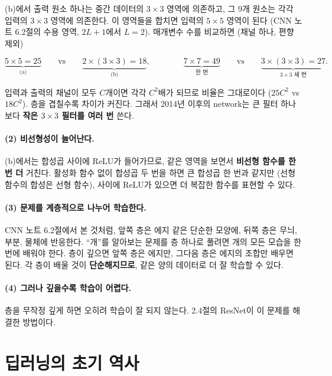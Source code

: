 \documentclass[11pt,a4paper]{article}
\begin{document}
(b)에서 출력 원소 하나는 중간 데이터의 $3\times3$ 영역에 의존하고, 그 $9$개 원소는 각각 입력의 $3\times3$ 영역에 의존한다.
이 영역들을 합치면 입력의 $5\times5$ 영역이 된다 (CNN 노트 6.2절의 수용 영역, $2L+1$에서 $L=2$).
매개변수 수를 비교하면 (채널 하나, 편향 제외)

\[
\underbrace{5\times5=25}_{\text{(a)}} \qquad\text{vs}\qquad \underbrace{2\times(3\times3)=18}_{\text{(b)}},
\qquad\qquad
\underbrace{7\times7=49}_{\text{한 번}} \qquad\text{vs}\qquad \underbrace{3\times(3\times3)=27}_{\text{$3\times3$ 세 번}} .
\]

입력과 출력의 채널이 모두 $C$개이면 각각 $C^2$배가 되므로 비율은 그대로이다 ($25C^2$ vs $18C^2$).
층을 겹칠수록 차이가 커진다. 그래서 2014년 이후의 network는 큰 필터 하나보다 \textbf{작은 $3\times3$ 필터를 여러 번} 쓴다.

\paragraph{(2) 비선형성이 늘어난다.}
(b)에서는 합성곱 사이에 ReLU가 들어가므로, 같은 영역을 보면서 \textbf{비선형 함수를 한 번 더} 거친다.
활성화 함수 없이 합성곱 두 번을 하면 큰 합성곱 한 번과 같지만 (선형 함수의 합성은 선형 함수),
사이에 ReLU가 있으면 더 복잡한 함수를 표현할 수 있다.

\paragraph{(3) 문제를 계층적으로 나누어 학습한다.}
CNN 노트 6.2절에서 본 것처럼, 앞쪽 층은 에지 같은 단순한 모양에, 뒤쪽 층은 무늬, 부분, 물체에 반응한다.
``개''를 알아보는 문제를 층 하나로 풀려면 개의 모든 모습을 한 번에 배워야 한다.
층이 깊으면 앞쪽 층은 에지만, 그다음 층은 에지의 조합만 배우면 된다.
각 층이 배울 것이 \textbf{단순해지므로}, 같은 양의 데이터로 더 잘 학습할 수 있다.

\paragraph{(4) 그러나 깊을수록 학습이 어렵다.}
층을 무작정 깊게 하면 오히려 학습이 잘 되지 않는다. 2.4절의 ResNet이 이 문제를 해결한 방법이다.

\section{딥러닝의 초기 역사}\label{sec:history}
\end{document}
